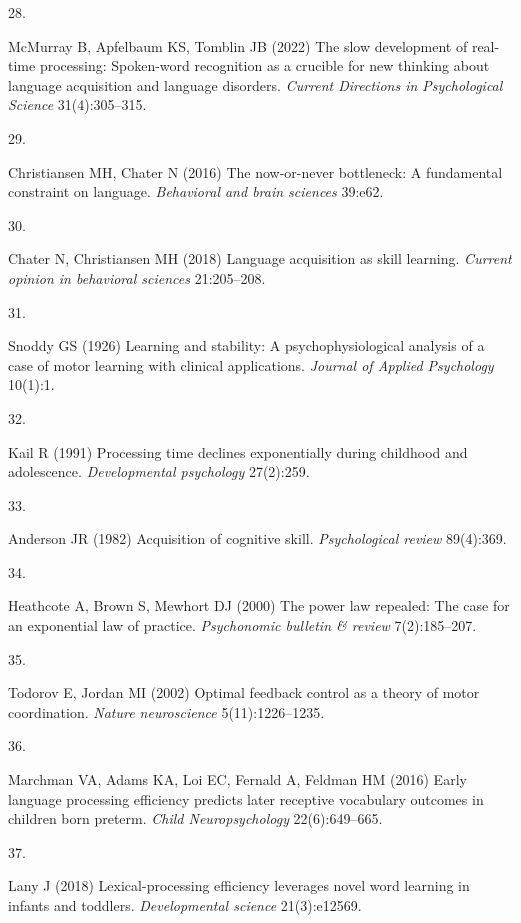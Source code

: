 \documentclass[9pt,twocolumn,twoside,]{pnas-new}
\newlength{\cslhangindent}
\newlength{\csllabelwidth}
\newenvironment{CSLReferences}[2] %
 {\begin{list}{}{%
  \setlength{\itemindent}{0pt}
  \setlength{\leftmargin}{0pt}
  \setlength{\parsep}{0pt}
  \ifodd #1
   \setlength{\leftmargin}{\cslhangindent}
   \setlength{\itemindent}{-1\cslhangindent}
  \fi
  \setlength{\itemsep}{#2\baselineskip}}}
 {\end{list}}
\newcommand{\CSLLeftMargin}[1]{\parbox[t]{\csllabelwidth}{#1}}
\newcommand{\CSLRightInline}[1]{\parbox[t]{\linewidth - \csllabelwidth}{#1}\break}
\begin{document}
\begin{CSLReferences}{0}{1}
\CSLLeftMargin{28. }%
\CSLRightInline{McMurray B, Apfelbaum KS, Tomblin JB (2022) The slow
development of real-time processing: Spoken-word recognition as a
crucible for new thinking about language acquisition and language
disorders. \emph{Current Directions in Psychological Science}
31(4):305--315.}

\CSLLeftMargin{29. }%
\CSLRightInline{Christiansen MH, Chater N (2016) The now-or-never
bottleneck: A fundamental constraint on language. \emph{Behavioral and
brain sciences} 39:e62.}

\CSLLeftMargin{30. }%
\CSLRightInline{Chater N, Christiansen MH (2018) Language acquisition as
skill learning. \emph{Current opinion in behavioral sciences}
21:205--208.}

\CSLLeftMargin{31. }%
\CSLRightInline{Snoddy GS (1926) Learning and stability: A
psychophysiological analysis of a case of motor learning with clinical
applications. \emph{Journal of Applied Psychology} 10(1):1.}

\CSLLeftMargin{32. }%
\CSLRightInline{Kail R (1991) Processing time declines exponentially
during childhood and adolescence. \emph{Developmental psychology}
27(2):259.}

\CSLLeftMargin{33. }%
\CSLRightInline{Anderson JR (1982) Acquisition of cognitive skill.
\emph{Psychological review} 89(4):369.}

\CSLLeftMargin{34. }%
\CSLRightInline{Heathcote A, Brown S, Mewhort DJ (2000) The power law
repealed: The case for an exponential law of practice. \emph{Psychonomic
bulletin \& review} 7(2):185--207.}

\CSLLeftMargin{35. }%
\CSLRightInline{Todorov E, Jordan MI (2002) Optimal feedback control as
a theory of motor coordination. \emph{Nature neuroscience}
5(11):1226--1235.}

\CSLLeftMargin{36. }%
\CSLRightInline{Marchman VA, Adams KA, Loi EC, Fernald A, Feldman HM
(2016) Early language processing efficiency predicts later receptive
vocabulary outcomes in children born preterm. \emph{Child
Neuropsychology} 22(6):649--665.}

\CSLLeftMargin{37. }%
\CSLRightInline{Lany J (2018) Lexical-processing efficiency leverages
novel word learning in infants and toddlers. \emph{Developmental
science} 21(3):e12569.}


\end{CSLReferences}
\end{document}
